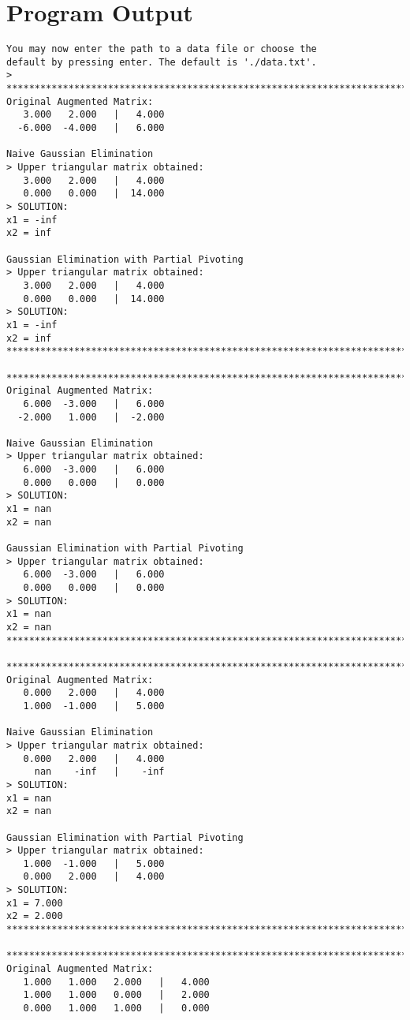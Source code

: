 \documentclass[letterpaper,10pt,titlepage]{report}
\begin{document}
\section{Program Output}
\begin{verbatim}
You may now enter the path to a data file or choose the
default by pressing enter. The default is './data.txt'.
>
********************************************************************************
Original Augmented Matrix:
   3.000   2.000   |   4.000
  -6.000  -4.000   |   6.000

Naive Gaussian Elimination
> Upper triangular matrix obtained:
   3.000   2.000   |   4.000
   0.000   0.000   |  14.000
> SOLUTION:
x1 = -inf
x2 = inf

Gaussian Elimination with Partial Pivoting
> Upper triangular matrix obtained:
   3.000   2.000   |   4.000
   0.000   0.000   |  14.000
> SOLUTION:
x1 = -inf
x2 = inf
********************************************************************************

********************************************************************************
Original Augmented Matrix:
   6.000  -3.000   |   6.000
  -2.000   1.000   |  -2.000

Naive Gaussian Elimination
> Upper triangular matrix obtained:
   6.000  -3.000   |   6.000
   0.000   0.000   |   0.000
> SOLUTION:
x1 = nan
x2 = nan

Gaussian Elimination with Partial Pivoting
> Upper triangular matrix obtained:
   6.000  -3.000   |   6.000
   0.000   0.000   |   0.000
> SOLUTION:
x1 = nan
x2 = nan
********************************************************************************

********************************************************************************
Original Augmented Matrix:
   0.000   2.000   |   4.000
   1.000  -1.000   |   5.000

Naive Gaussian Elimination
> Upper triangular matrix obtained:
   0.000   2.000   |   4.000
     nan    -inf   |    -inf
> SOLUTION:
x1 = nan
x2 = nan

Gaussian Elimination with Partial Pivoting
> Upper triangular matrix obtained:
   1.000  -1.000   |   5.000
   0.000   2.000   |   4.000
> SOLUTION:
x1 = 7.000
x2 = 2.000
********************************************************************************

********************************************************************************
Original Augmented Matrix:
   1.000   1.000   2.000   |   4.000
   1.000   1.000   0.000   |   2.000
   0.000   1.000   1.000   |   0.000


\end{verbatim}
\end{document}

